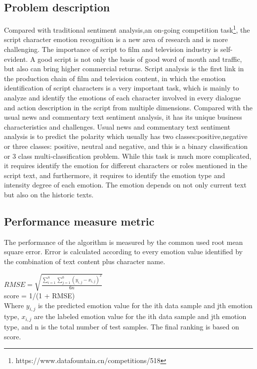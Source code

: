 \documentclass[12pt,twocolumn,letterpaper]{article}
\begin{document}
\subsection{Problem description}
Compared with traditional sentiment analysis,an on-going competition task\footnote{https://www.datafountain.cn/competitions/518}, the script character emotion recognition is a new area of research and is more challenging. The importance of script to film and television industry is self-evident. A good script is not only the basis of good word of mouth and traffic, but also can bring higher commercial returns. Script analysis is the first link in the production chain of film and television content, in which the emotion identification of script characters is a very important task, which is mainly to analyze and identify the emotions of each character involved in every dialogue and action description in the script from multiple dimensions. Compared with the usual news and commentary text sentiment analysis, it has its unique business characteristics and challenges. Usual news and commentary text sentiment analysis is to predict the polarity which usually has two classes:positive,negative or three classes: positive, neutral and negative, and this is a binary classification or 3 class multi-classification problem. While this task is much more complicated, it requires identify the emotion for different characters or roles mentioned in the script text, and furthermore, it requires to identify the emotion type and intensity degree of each emotion. The emotion depends on not only current text but also on the historic texts.

\subsection{Performance measure metric}
The performance of the algorithm is measured by the common used root mean square error. Error is calculated according to every emotion value identified by the combination of text content plus character name.

$R M S E=\sqrt{\frac{\sum_{i=1}^{n} \sum_{j=1}^{6}\left(y_{i, j}-x_{i, j}\right)^{2}}{6 n}}$\\

score = 1/(1 + RMSE)\\

Where $y_{i,j}$ is the predicted emotion value for the ith data sample and jth emotion type, $x_{i,j}$ are the labeled emotion value for the ith data sample and jth emotion type, and n is the total number of test samples.  
The final ranking is based on score. 
\end{document}

